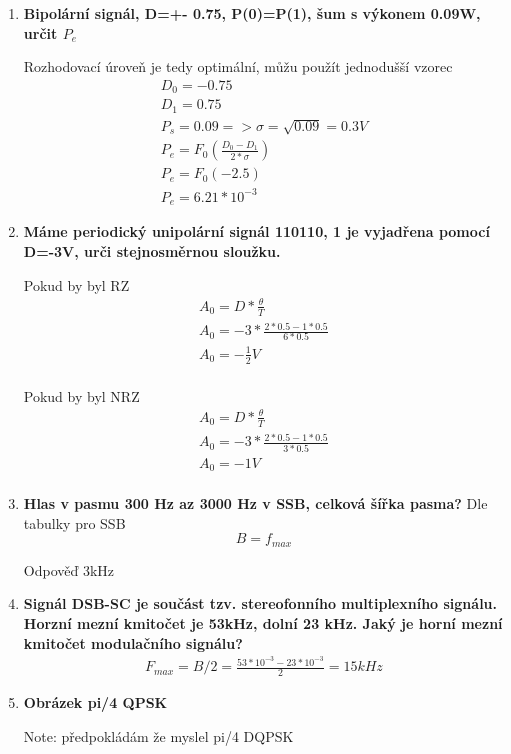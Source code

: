 \begin{enumerate}
    \item \textbf{Bipolární signál, D=+- 0.75, P(0)=P(1),  šum s výkonem 0.09W, určit $P_e$}

    Rozhodovací úroveň je tedy optimální, můžu použít jednodušší vzorec
    \begin{align*}
        D_0=-0.75 \\
        D_1=0.75 \\
        P_s = 0.09 => \sigma=\sqrt{0.09}=0.3V \\
        P_e = F_0(\frac{D_0-D_1}{2*\sigma}) \\
        P_e= F_0(-2.5) \\
        P_e= 6.21*10^{-3}
    \end{align*}
    
    \item \textbf{Máme periodický unipolární signál 110110, 1 je vyjadřena pomocí D=-3V, urči stejnosměrnou sloužku.}

    Pokud by byl RZ
\begin{align*}
     A_0 = D*\frac{\theta}{T} \\
        A_0 = -3 *\frac{2*0.5-1*0.5}{6*0.5} \\
        A_0 = -\frac{1}{2}V \\
\end{align*}

Pokud by byl NRZ
\begin{align*}
     A_0 = D*\frac{\theta}{T} \\
        A_0 = -3 *\frac{2*0.5-1*0.5}{3*0.5} \\
        A_0 = -1V \\
\end{align*}
\break

\item \textbf{Hlas v pasmu 300 Hz az 3000 Hz v SSB, celková šířka pasma?}
Dle tabulky pro SSB
$$B=f_{max}$$

Odpověď 3kHz

\item \textbf{Signál DSB-SC je součást tzv. stereofonního multiplexního signálu. Horzní mezní kmitočet je 53kHz, dolní 23 kHz. Jaký je horní mezní kmitočet modulačního signálu?}
\begin{align*}
    F_{max}=B/2=\frac{53*10^{-3}-23*10^{-3}}{2} = 15kHz
\end{align*}

\item \textbf{Obrázek pi/4 QPSK}

Note: předpokládám že myslel pi/4 DQPSK


\end{enumerate}
